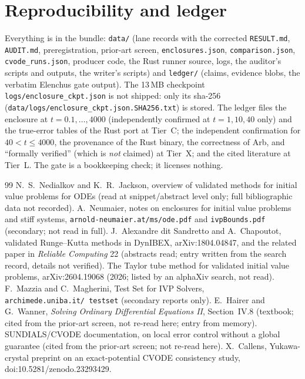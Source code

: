 \documentclass[11pt]{article}
\theoremstyle{remark}
\begin{document}
\section{Reproducibility and ledger}\label{sec:ledger}
Everything is in the bundle: \texttt{data/} (lane records with the corrected \texttt{RESULT.md}, \texttt{AUDIT.md}, preregistration, prior-art screen, \texttt{enclosures.json}, \texttt{comparison.json}, \texttt{cvode\_runs.json}, producer code, the Rust runner source, logs, the auditor's scripts and outputs, the writer's scripts) and \texttt{ledger/} (claims, evidence blobs, the verbatim Elenchus gate output). The 13\,MB checkpoint \texttt{logs/enclosure\_ckpt.json} is not shipped: only its sha-256 (\texttt{data/logs/enclosure\_ckpt.json.SHA256.txt}) is stored. The ledger files the enclosure at $t=0.1,\dots,4000$ (independently confirmed at $t=1,10,40$ only) and the true-error tables of the Rust port at Tier~C; the independent confirmation for $40<t\le4000$, the provenance of the Rust binary, the correctness of Arb, and ``formally verified'' (which is \emph{not} claimed) at Tier~X; and the cited literature at Tier~L. The gate is a bookkeeping check; it licenses nothing.

\begin{thebibliography}{99}\small
{} N.~S.~Nedialkov and K.~R.~Jackson, overview of validated methods for initial value problems for ODEs (read at snippet/abstract level only; full bibliographic data not recorded).
 A.~Neumaier, notes on enclosures for initial value problems and stiff systems, \texttt{arnold-neumaier.at/ms/ode.pdf} and \texttt{ivpBounds.pdf} (secondary; not read in full).
 J.~Alexandre dit Sandretto and A.~Chapoutot, validated Runge--Kutta methods in DynIBEX, arXiv:1804.04847, and the related paper in \emph{Reliable Computing} 22 (abstracts read; entry written from the search record, details not verified).
 The Taylor tube method for validated initial value problems, arXiv:2604.19068 (2026; listed by an alphaXiv search, not read).
 F.~Mazzia and C.~Magherini, Test Set for IVP Solvers, \texttt{archimede.uniba.it/\string~testset} (secondary reports only).
 E.~Hairer and G.~Wanner, \emph{Solving Ordinary Differential Equations II}, Section~IV.8 (textbook; cited from the prior-art screen, not re-read here; entry from memory).
 SUNDIALS/CVODE documentation, on local error control without a global guarantee (cited from the prior-art screen; not re-read here).
 X.~Callens, Yukawa-crystal preprint on an exact-potential CVODE consistency study, doi:10.5281/zenodo.23293429.
\end{thebibliography}
\end{document}
